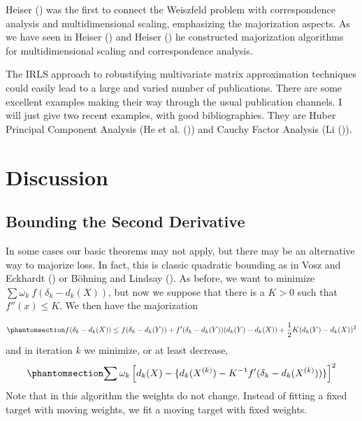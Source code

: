 \documentclass[
  12pt,
  letterpaper,
  DIV=11,
  numbers=noendperiod]{scrartcl}
\newcommand{\sectionbreak}{\pagebreak}
\theoremstyle{definition}
\theoremstyle{plain}
\theoremstyle{plain}
\theoremstyle{remark}
\begin{document}
Heiser () was the first to connect the
Weiszfeld problem with correspondence analysis and multidimensional
scaling, emphasizing the majorization aspects. As we have seen in Heiser
() and Heiser
() he constructed majorization algorithms
for multidimensional scaling and correspondence analysis.

The IRLS approach to robustifying multivariate matrix approximation
techniques could easily lead to a large and varied number of
publications. There are some excellent examples making their way through
the usual publication channels. I will just give two recent examples,
with good bibliographies. They are Huber Principal Component Analysis
(He et al. ()) and Cauchy Factor
Analysis (Li ()).

\sectionbreak

\section{Discussion}\label{discussion}

\subsection{Bounding the Second
Derivative}\label{bounding-the-second-derivative}

In some cases our basic theorems may not apply, but there may be an
alternative way to majorize loss. In fact, this is classic quadratic
bounding as in Vosz and Eckhardt ()
or Böhning and Lindsay (). As
before, we want to minimize \(\sum \omega_k\ f(\delta_k-d_k(X))\), but
now we suppose that there is a \(K>0\) such that \(f''(x)\leq K\). We
then have the majorization

\begin{equation}\phantomsection\label{eq-qbound}{
f(\delta_k-d_k(X))\leq f(\delta_k-d_k(Y))+f'(\delta_k-d_k(Y))(d_k(Y)-d_k(X))+\frac12K(d_k(Y)-d_k(X))^2
}\end{equation} and in iteration \(k\) we minimize, or at least
decrease, \begin{equation}\phantomsection\label{eq-qiter}{
\sum \omega_k\left[d_k(X)-\{d_k(X^{(k)})-K^{-1}f'(\delta_k-d_k(X^{(k)}))\}\right]^2
}\end{equation} Note that in this algorithm the weights do not change.
Instead of fitting a fixed target with moving weights, we fit a moving
target with fixed weights.
\end{document}
